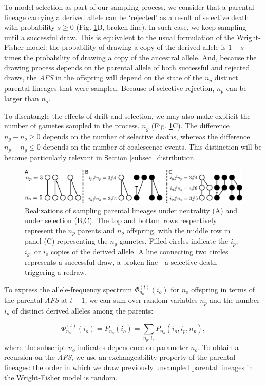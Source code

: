 \documentclass[review]{elsarticle}
\newcommand{\afs}[2]{\Phi_{#1}^{(#2)}}
\begin{document}
To model selection as part of our sampling process, we consider that a parental lineage carrying a
derived allele can be `rejected' as a result of selective death with probability $s\ge0$ (Fig.
\ref{fig_schematic}B, broken line). In such case, we keep sampling until a successful draw. This is
equivalent to the usual formulation of the Wright-Fisher model: the probability of drawing a copy of the
derived allele is $1-s$ times the probability of drawing a copy of the ancestral allele. And, because the drawing
process depends on the parental allele of both successful and rejected draws, the \textit{AFS} in the
offspring will depend on the state of the $n_p$ distinct parental lineages that were sampled. 
Because of selective rejection, $n_p$ can be larger than
$n_o$. 

To disentangle the effects of drift and selection, we may also make explicit the number of gametes
sampled in the process, $n_g$ (Fig. \ref{fig_schematic}C). The difference $n_g-n_o  \ge 0$
depends on the number of selective deaths, whereas the difference $n_p-n_g \le 0$ depends
on the number of coalescence events. This distinction will be become particularly relevant in Section
\ref{subsec_distribution}. 

\begin{figure}[h]
  \centering
  \includegraphics[width=1.0\textwidth]{fig/schematic.pdf}
  \caption{\label{fig_schematic} Realizations of sampling parental lineages under neutrality (A) and
    under selection (B,C). The top and bottom rows respectively represent the $n_p$ parents and
    $n_o$ offspring, with the middle row in panel (C) representing the $n_g$ gametes. Filled circles
    indicate the $i_p$, $i_g$, or $i_o$ copies of the derived allele. A line connecting two circles
    represents a successful draw, a broken line - a selective death triggering a redraw. }
\end{figure}

To express the allele-frequency spectrum $\afs{n_o}{t}(i_o)$ for $n_o$ offspring in terms of the parental
\textit{AFS} at $t-1$, we can sum over random variables $n_p$ and the number $i_p$ of distinct derived alleles
among the parents:

\begin{equation}
  \afs{n_o}{t}(i_o)=P_{n_o} (i_o) =\sum_{n_p,i_p} P_{n_o}(i_o,i_p,n_p),
\end{equation}
where the subscript $n_o$ indicates dependence on parameter $n_o$. To obtain a recursion on the
\textit{AFS}, we use an exchangeability property of the parental lineages: the order
 in which we draw previously unsampled parental lineages in the Wright-Fisher
model is random. 
\end{document}
